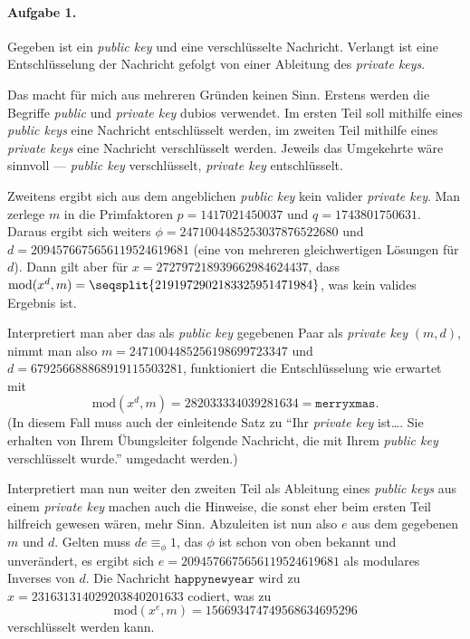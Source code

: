 \documentclass{article}
\newcommand{\cmod}{\text{mod}}
\begin{document}
\paragraph{Aufgabe 1.}

Gegeben ist ein \emph{public key} und eine verschlüsselte Nachricht. Verlangt ist eine Entschlüsselung der Nachricht gefolgt von einer Ableitung des \emph{private keys}.

Das macht für mich aus mehreren Gründen keinen Sinn. Erstens werden die Begriffe \emph{public} und \emph{private key} dubios verwendet. Im ersten Teil soll mithilfe eines \emph{public keys} eine Nachricht entschlüsselt werden, im zweiten Teil mithilfe eines \emph{private keys} eine Nachricht verschlüsselt werden. Jeweils das Umgekehrte wäre sinnvoll --- \emph{public key} verschlüsselt, \emph{private key} entschlüsselt.

Zweitens ergibt sich aus dem angeblichen \emph{public key} kein valider \emph{private key}. Man zerlege $m$ in die Primfaktoren $p = 1417021450037$ und $q = 1743801750631$. Daraus ergibt sich weiters $\phi = 2471004485253037876522680$ und $d = 2094576675656119524619681$ (eine von mehreren gleichwertigen Lösungen für $d$). Dann gilt aber für $x = 272797218939662984624437$, dass $\cmod(x^d, m) = \seqsplit{2191972902183325951471984}$, was kein valides Ergebnis ist.

Interpretiert man aber das als \emph{public key} gegebenen Paar als \emph{private key} $(m, d)$, nimmt man also $m = 2471004485256198699723347$ und $d = 679256688868919115503281$, funktioniert die Entschlüsselung wie erwartet mit
\begin{equation*}
    \cmod(x^d, m) = 282033334039281634 = \texttt{merryxmas}.
\end{equation*} (In diesem Fall muss auch der einleitende Satz zu \enquote{Ihr \emph{private key} ist\ldots. Sie erhalten von Ihrem Übungsleiter folgende Nachricht, die mit Ihrem \emph{public key} verschlüsselt wurde.} umgedacht werden.)

Interpretiert man nun weiter den zweiten Teil als Ableitung eines \emph{public keys} aus einem \emph{private key} machen auch die Hinweise, die sonst eher beim ersten Teil hilfreich gewesen wären, mehr Sinn. Abzuleiten ist nun also $e$ aus dem gegebenen $m$ und $d$. Gelten muss $de \equiv_{\phi} 1$, das $\phi$ ist schon von oben bekannt und unverändert, es ergibt sich $e = 2094576675656119524619681$ als modulares Inverses von $d$. Die Nachricht $\texttt{happynewyear}$ wird zu $x = 231631314029203840201633$ codiert, was zu
\begin{equation*}
    \cmod(x^e, m) = 156693474749568634695296
\end{equation*}
verschlüsselt werden kann.
\end{document}
